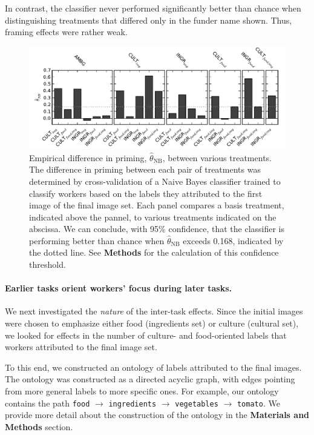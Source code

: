 \documentclass[a4paper]{report}
\begin{document}
In contrast, the classifier never performed significantly better than chance
when distinguishing treatments that differed only in the funder name shown. 
Thus, framing effects were rather weak.

\begin{figure}
	\includegraphics[scale=0.94]{figs/f1-thetas_full_pairwise25_img1.pdf}
	\caption{ \footnotesize{
		Empirical difference in priming, $\hat{\theta}_\text{NB}$, between 
		various treatments.  The difference in priming between each pair of 
		treatments 
		was determined by cross-validation of a Naive Bayes classifier trained
		to classify workers based on the labels they attributed to the first
		image of the final image set. Each panel compares a basis treatment,
		indicated above the pannel, to various treatments indicated on the
		abscissa.  We can conclude, with 95\% confidence, that the classifier
		is performing better than chance when $\hat{\theta}_\text{NB}$ 
		exceeds 0.168, indicated by the dotted line.  See \textbf{Methods} for
		the calculation of this confidence threshold.
	}}
\end{figure}

\paragraph{Earlier tasks orient workers' focus during later tasks.} 
We next investigated the \textit{nature} of the inter-task effects.  Since the
initial images were chosen to emphasize either food (ingredients set) or 
culture (cultural set), we looked for effects in the number of culture- and 
food-oriented labels that workers attributed to the final image set.

To this end, we constructed an ontology of labels attributed to the final 
images.  The ontology was constructed as a directed acyclic graph, with edges 
pointing from more general labels to more specific ones.
For example, our ontology contains the path \texttt{food} $\to$ 
\texttt{ingredients} $\to$ \texttt{vegetables} $\to$ \texttt{tomato}. We 
provide more detail about the construction of the ontology in the 
\textbf{Materials and Methods} section.
\end{document}
